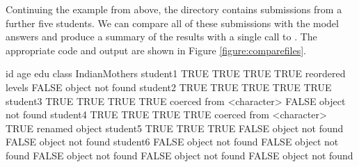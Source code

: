 Continuing the example from above,
the  directory contains submissions from a further
five students.  We can compare all of these submissions
with the model answers and produce a summary of the results with
a single call to . The appropriate code
and output are shown in Figure
\ref{figure:comparefiles}.

\begin{figure*}
\begin{Schunk}
\end{Schunk}
{\scriptsize
\begin{Schunk}
\begin{Soutput}
         id                     age                    edu                    class                         IndianMothers         
student1 TRUE                   TRUE                   TRUE                   TRUE reordered levels         FALSE object not found
student2 TRUE                   TRUE                   TRUE                   TRUE                          TRUE                  
student3 TRUE                   TRUE                   TRUE                   TRUE coerced from <character> FALSE object not found
student4 TRUE                   TRUE                   TRUE                   TRUE coerced from <character> TRUE renamed object   
student5 TRUE                   TRUE                   TRUE                   FALSE object not found        FALSE object not found
student6 FALSE object not found FALSE object not found FALSE object not found FALSE object not found        FALSE object not found
\end{Soutput}
\end{Schunk}
}
\caption{\label{figure:comparefiles}%
Using the  function to run \R{} code from several
files and compare the results to model objects.  The result of this sort
of comparison can easily get quite wide, so it is often useful to 
print the result with  set to some large value
and using a small font, as has been done here.}
\end{figure*}

